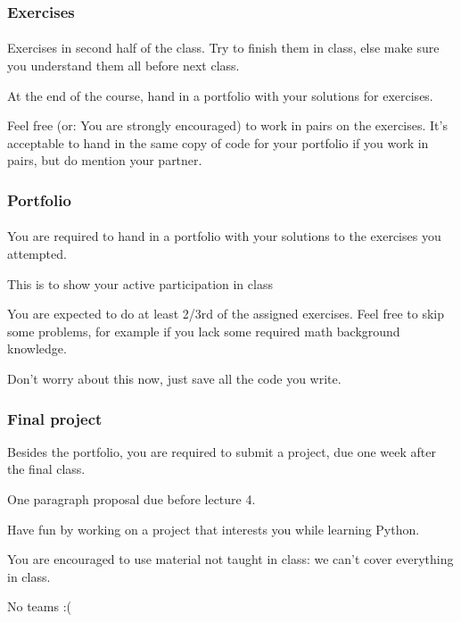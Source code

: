 \begin{frame}\frametitle{Exercises}
    \framesubtitle{}

    Exercises in second half of the class. Try to finish them in class,
    else make sure you understand them all before next class.

    \vfill

    At the end of the course, hand in a portfolio with your solutions for exercises.

    \vfill

    Feel free (or: You are strongly encouraged) to work in pairs on the exercises.
    It's acceptable to hand in the same copy of code for your portfolio if you work in pairs,
    but do mention your partner.

\end{frame}

\begin{frame}\frametitle{Portfolio}
    \framesubtitle{}

    You are required to hand in a portfolio with your solutions to the exercises you attempted.

    \vfill

    This is to show your active participation in class

    \vfill

    You are expected to do at least 2/3rd of the assigned exercises.
    Feel free to skip some problems, for example if you lack some required math background knowledge.

    \vfill

    Don't worry about this now, just save all the code you write.

\end{frame}

\begin{frame}\frametitle{Final project}

    Besides the portfolio, you are required to submit a project,
    due one week after the final class.

    \vfill

    One paragraph proposal due before lecture 4.

    \vfill

    Have fun by working on a project that interests you while learning Python.

    \vfill

    You are encouraged to use material not taught in class:
    we can't cover everything in class.

    \vfill

    No teams :(


\end{frame}

